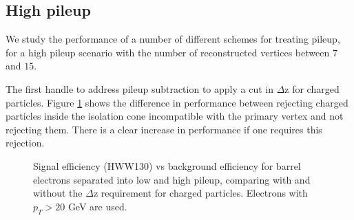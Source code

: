 \subsection{High pileup}

We study the performance of a number of different schemes for treating pileup,
for a high pileup scenario with the number of reconstructed vertices between 
$7$ and $15$. 

The first handle to address pileup subtraction to apply a cut in $\Delta$z for 
charged particles. Figure \ref{fig:IsoPerformance_EleBarrel_dZCut} shows the difference
in performance between rejecting charged particles inside the isolation cone 
incompatible with the primary vertex and not rejecting them. There is a clear increase
in performance if one requires this rejection.

\begin{figure}[!htbp]
\begin{center}
\caption{ Signal efficiency (HWW130) vs background efficiency for barrel electrons separated into 
low and high pileup, comparing with and without the $\Delta$z requirement for charged particles.
Electrons with $p_{T} > 20$ GeV are used. }
\label{fig:IsoPerformance_EleBarrel_dZCut}
\end{center}
\end{figure}


